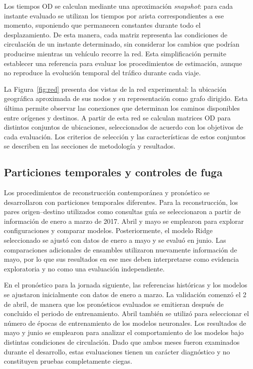 \documentclass[letterpaper,11pt]{article}
\begin{document}
Los tiempos OD se calculan mediante una aproximación \emph{snapshot}: para cada instante evaluado se utilizan los tiempos por arista correspondientes a ese momento, suponiendo que permanecen constantes durante todo el desplazamiento. De esta manera, cada matriz representa las condiciones de circulación de un instante determinado, sin considerar los cambios que podrían producirse mientras un vehículo recorre la red. Esta simplificación permite establecer una referencia para evaluar los procedimientos de estimación, aunque no reproduce la evolución temporal del tráfico durante cada viaje.

La Figura~\ref{fig:red} presenta dos vistas de la red experimental: la ubicación geográfica aproximada de sus nodos y su representación como grafo dirigido. Esta última permite observar las conexiones que determinan los caminos disponibles entre orígenes y destinos. A partir de esta red se calculan matrices OD para distintos conjuntos de ubicaciones, seleccionados de acuerdo con los objetivos de cada evaluación. Los criterios de selección y las características de estos conjuntos se describen en las secciones de metodología y resultados.

\subsection{Particiones temporales y controles de fuga}
Los procedimientos de reconstrucción contemporánea y pronóstico se desarrollaron con particiones temporales diferentes. Para la reconstrucción, los pares origen--destino utilizados como consultas guía se seleccionaron a partir de información de enero a marzo de 2017. Abril y mayo se emplearon para explorar configuraciones y comparar modelos. Posteriormente, el modelo Ridge seleccionado se ajustó con datos de enero a mayo y se evaluó en junio. Las comparaciones adicionales de ensambles utilizaron nuevamente información de mayo, por lo que sus resultados en ese mes deben interpretarse como evidencia exploratoria y no como una evaluación independiente.

En el pronóstico para la jornada siguiente, las referencias históricas y los modelos se ajustaron inicialmente con datos de enero a marzo. La validación comenzó el 2 de abril, de manera que los pronósticos evaluados se emitieran después de concluido el periodo de entrenamiento. Abril también se utilizó para seleccionar el número de épocas de entrenamiento de los modelos neuronales. Los resultados de mayo y junio se emplearon para analizar el comportamiento de los modelos bajo distintas condiciones de circulación. Dado que ambos meses fueron examinados durante el desarrollo, estas evaluaciones tienen un carácter diagnóstico y no constituyen pruebas completamente ciegas.
\end{document}
